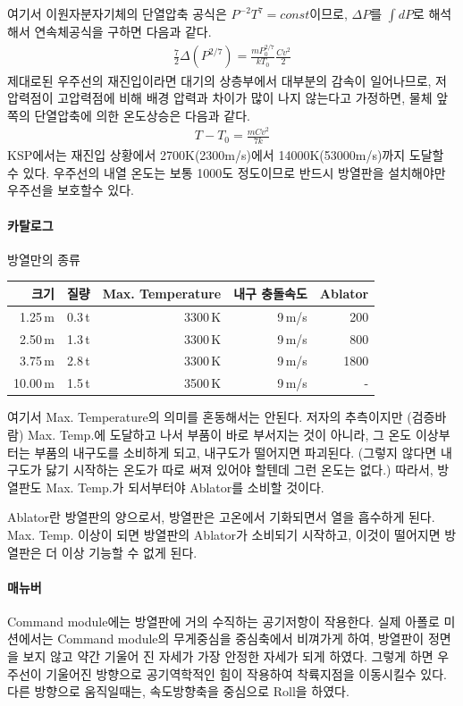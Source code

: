 \documentclass[9pt]{amsbook}
\begin{document}
여기서 이원자분자기체의 단열압축 공식은 $P^{-2}T^7=const$이므로, $\Delta P$를 $\int dP$로 해석해서 연속체공식을 구하면 다음과 같다.
\begin{align}
	\frac{7}{2}\Delta(P^{2/7}) = \frac{mP_0^{2/7}}{kT_0} \frac{Cv^2}{2}
\end{align}
제대로된 우주선의 재진입이라면 대기의 상층부에서 대부분의 감속이 일어나므로, 저압력점이 고압력점에 비해 배경 압력과 차이가 많이 나지 않는다고 가정하면, 물체 앞쪽의 단열압축에 의한 온도상승은 다음과 같다.
\begin{align}
T-T_0 = \frac{mCv^2}{7k}
\end{align}
KSP에서는 재진입 상황에서 2700K(2300m/s)에서 14000K(53000m/s)까지 도달할 수 있다. 우주선의 내열 온도는 보통 1000도 정도이므로 반드시 방열판을 설치해야만 우주선을 보호할수 있다.

\paragraph{카탈로그}
\par
\begin{threeparttable}
\caption{방열만의 종류}
\begin{tabular}{|r|r|r|r|r|}
\hline
크기&질량& Max. Temperature& 내구 충돌속도& Ablator
\\\hline
1.25\,m&0.3\,t& 3300\,K&9\,m/s&200
\\2.50\,m&1.3\,t&3300\,K&9\,m/s&800
\\3.75\,m&2.8\,t&3300\,K&9\,m/s&1800
\\10.00\,m&1.5\,t&3500\,K&9\,m/s&-
\\\hline
\end{tabular}
\end{threeparttable}

여기서 Max. Temperature의 의미를 혼동해서는 안된다. 저자의 추측이지만 (검증바람) Max. Temp.에 도달하고 나서 부품이 바로 부서지는 것이 아니라, 그 온도 이상부터는 부품의 내구도를 소비하게 되고, 내구도가 떨어지면 파괴된다. (그렇지 않다면 내구도가 닳기 시작하는 온도가 따로 써져 있어야 할텐데 그런 온도는 없다.) 따라서, 방열판도 Max. Temp.가 되서부터야 Ablator를 소비할 것이다.

Ablator란 방열판의 양으로서, 방열판은 고온에서 기화되면서 열을 흡수하게 된다. Max. Temp. 이상이 되면 방열판의 Ablator가 소비되기 시작하고, 이것이 떨어지면 방열판은 더 이상 기능할 수 없게 된다.
\paragraph{매뉴버}
Command module에는 방열판에 거의 수직하는 공기저항이 작용한다. 실제 아폴로 미션에서는 Command module의 무게중심을 중심축에서 비껴가게 하여, 방열판이 정면을 보지 않고 약간 기울어 진 자세가 가장 안정한 자세가 되게 하였다. 그렇게 하면 우주선이 기울어진 방향으로 공기역학적인 힘이 작용하여 착륙지점을 이동시킬수 있다. 다른 방향으로 움직일때는, 속도방향축을 중심으로 Roll을 하였다.
\end{document}
